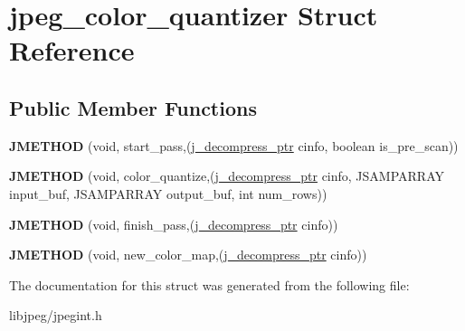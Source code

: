 \hypertarget{structjpeg__color__quantizer}{\section{jpeg\-\_\-color\-\_\-quantizer Struct Reference}
\label{structjpeg__color__quantizer}
}
\subsection*{Public Member Functions}
\begin{DoxyCompactItemize}
\item 
\hypertarget{structjpeg__color__quantizer_a3296d9d04a267c50808154ce6bdcef1b}{{\bfseries J\-M\-E\-T\-H\-O\-D} (void, start\-\_\-pass,(\hyperlink{structjpeg__decompress__struct}{j\-\_\-decompress\-\_\-ptr} cinfo, boolean is\-\_\-pre\-\_\-scan))}\label{structjpeg__color__quantizer_a3296d9d04a267c50808154ce6bdcef1b}

\item 
\hypertarget{structjpeg__color__quantizer_ac11184c8e0fdc9c0ec200c0fab197b5f}{{\bfseries J\-M\-E\-T\-H\-O\-D} (void, color\-\_\-quantize,(\hyperlink{structjpeg__decompress__struct}{j\-\_\-decompress\-\_\-ptr} cinfo, J\-S\-A\-M\-P\-A\-R\-R\-A\-Y input\-\_\-buf, J\-S\-A\-M\-P\-A\-R\-R\-A\-Y output\-\_\-buf, int num\-\_\-rows))}\label{structjpeg__color__quantizer_ac11184c8e0fdc9c0ec200c0fab197b5f}

\item 
\hypertarget{structjpeg__color__quantizer_abb5268c27447bc9ae1876c5fffa94081}{{\bfseries J\-M\-E\-T\-H\-O\-D} (void, finish\-\_\-pass,(\hyperlink{structjpeg__decompress__struct}{j\-\_\-decompress\-\_\-ptr} cinfo))}\label{structjpeg__color__quantizer_abb5268c27447bc9ae1876c5fffa94081}

\item 
\hypertarget{structjpeg__color__quantizer_a9531395d8c6f914f57bea01ff2b2c5b4}{{\bfseries J\-M\-E\-T\-H\-O\-D} (void, new\-\_\-color\-\_\-map,(\hyperlink{structjpeg__decompress__struct}{j\-\_\-decompress\-\_\-ptr} cinfo))}\label{structjpeg__color__quantizer_a9531395d8c6f914f57bea01ff2b2c5b4}

\end{DoxyCompactItemize}


The documentation for this struct was generated from the following file\-:\begin{DoxyCompactItemize}
\item 
libjpeg/jpegint.\-h\end{DoxyCompactItemize}
